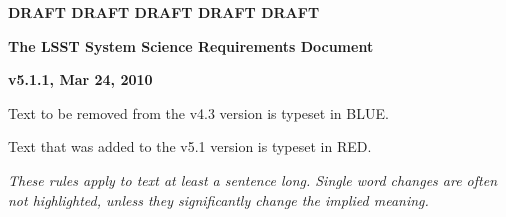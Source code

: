 \documentclass[11pt,letterpaper]{article}
\newcommand{\B}[1]{{\color{blue} #1}}
\newcommand{\R}[1]{{\color{red} #1}}
\newcommand{\G}[1]{{\color{red} #1}}
\begin{document}
\centerline{\Large\bf \R{DRAFT DRAFT DRAFT DRAFT DRAFT}}

\centerline{\Large\bf The LSST System Science Requirements Document}
\centerline{\large\bf v5.1.1, Mar 24, 2010}


\B{Text to be removed from the v4.3 version is typeset in BLUE.}


\G{Text that was added to the v5.1 version is typeset in RED.}


{\it These rules apply to text at least a sentence long. Single word
changes are often not highlighted, unless they significantly change the
implied meaning.}











\newpage
\printglossary
\end{document}
